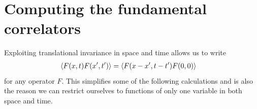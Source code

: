 \documentclass[english, parskip=full]{scrartcl}
\begin{document}
\section{Computing the fundamental correlators}
Exploiting translational invariance in space and time allows us to write
\begin{align}
\bra*{F(x,t)F(x',t')} &= \bra*{F(x-x',t-t')F(0,0)}
\end{align}
for any operator $F$.
This simplifies some of the following calculations and is also the reason we can restrict ourselves to functions of only one variable in both space and time.
\end{document}

